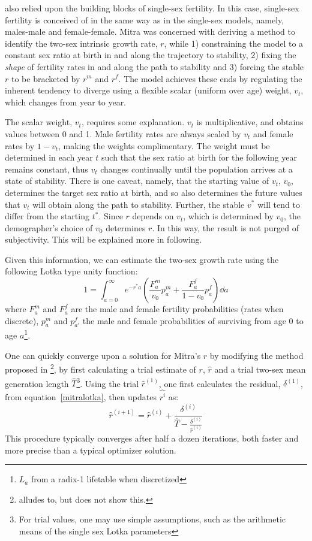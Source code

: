 
\citet{mitra1978derivation} also relied upon the
building blocks of single-sex fertility. In this case, single-sex fertility is
conceived of in the same way as in the single-sex models, namely, males-male
and female-female. Mitra was concerned with deriving a method
to identify the two-sex intrinsic growth rate, $r$, while 1) constraining the
model to a constant sex ratio at birth in and along the trajectory to
stability, 2) fixing the \textit{shape} of fertility rates in and along
the path to stability and 3) forcing the stable $r$ to be
bracketed by $r^m$ and $r^f$. The model achieves these ends by regulating the
inherent tendency to diverge using a flexible scalar (uniform over age) weight,
$v_t$, which changes from year to year.

The scalar weight, $v_t$, requires some explanation. $v_t$ is multiplicative,
and obtains values between 0 and 1. Male fertility rates are always scaled by
$v_t$ and female rates by $1-v_t$, making the weights complimentary. The weight
must be determined in each year $t$ such that the sex ratio at birth for the
following year remains constant, thus $v_t$ changes continually until the
population arrives at a state of stability. There is one caveat, namely, that
the starting value of $v_t$, $v_0$, determines the target sex ratio at birth,
and so also determines the future values that $v_t$ will obtain along the path
to stability. Further, the stable $v^\ast$ will tend to differ from the starting
$t^\ast$. Since $r$ depends on $v_t$, which is determined by $v_0$, the
demographer's choice of $v_0$ determines $r$. In this way, the result is not
purged of subjectivity. This will be explained more in following.

Given this information, we can estimate the two-sex growth rate using the
following Lotka type unity function:
\begin{equation}
\label{mitralotka}
1 = \int _{a=0} ^\infty e^{-r^\ast a} \left(\frac{F_a ^m}{v_0} p_a^m  +
\frac{F_a ^f}{1 - v_0} p_a^f\right) \dd a
\end{equation}
where $F_a ^m$ and $F_a ^f$ are the male and female fertility probabilities
(rates when discrete), $p_a^m$ and $p_{a'}^f$ the male and female probabilities
of surviving from age $0$ to age $a$\footnote{$L_a$ from a radix-1 lifetable when
discretized}.

One can quickly converge upon a solution for Mitra's $r$ by modifying the
method proposed in \citet{coale1957new}\footnote{\citet{mitra1978derivation} alludes
to, but does not show this.}, by first calculating a trial estimate of $r$,
$\hat{r}$ and a trial two-sex mean generation length
$\widehat{T}$\footnote{For trial values, one may use simple
assumptions, such as the arithmetic means of the single sex Lotka parameters}.
Using the trial $\hat{r}^{(1)}$, one first calculates the residual, 
$\delta ^{(1)}$, from equation~\eqref{mitralotka}, then updates $\widehat{r^i}$
as:
\begin{equation}
\hat{r}^{(i+1)} = \hat{r}^{(i)} + \frac{\delta
^{(i)}}{\widehat{T} -
\frac{\delta ^{(i)}}{\hat{r}^{(i)} }}
\end{equation}
This procedure typically converges after half a dozen iterations, both faster
and more precise than a typical optimizer solution.

